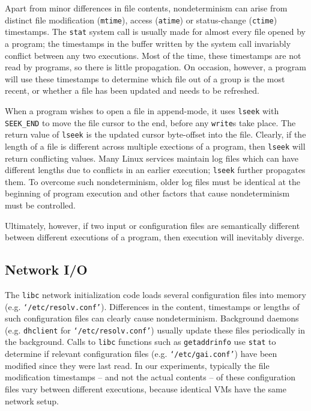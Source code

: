  \newline
Apart from minor differences in file contents,
nondeterminism can arise from distinct file 
modification (\texttt{mtime}), access (\texttt{atime}) or status-change (\texttt{ctime})
timestamps.
The \texttt{stat} system call is usually made for almost
every file opened by a program; the timestamps
in the buffer written by the system call invariably
conflict between any two executions. Most of the time,
these timestamps are not read by programs,
so there is little propagation. On occasion, 
however, a program will use these timestamps
to determine which file out of a group is the most recent, 
or whether a file has been updated
and needs to be refreshed. \newline

 \newline
When a program wishes to open
a file in append-mode, it uses \texttt{lseek}
with \texttt{SEEK\_END} to move
the file cursor to the end,
before any \texttt{write}s take place.
The return value of \texttt{lseek} is the
updated cursor byte-offset into the file.
Clearly, if the length of a file is different across
multiple exections of a program, then
\texttt{lseek} will return conflicting values.
Many Linux services maintain log files
which can have different lengths due
to conflicts in an earlier execution; \texttt{lseek}
further propagates them. To overcome
such nondeterminism, older log files
must be identical at the beginning 
of program execution and other
factors that cause nondeterminism
must be controlled. 

\newpage
Ultimately, however, if two input or configuration files
are semantically different between
different executions of a program, then 
execution will inevitably diverge. 

\subsection{Network I/O} \label{ch3:netio}
 \newline
The \texttt{libc} network initialization
code loads several configuration files
into memory (e.g. \texttt{`/etc/resolv.conf'}). 
Differences in the content, timestamps or lengths
of such configuration files can clearly cause nondeterminism.
Background daemons (e.g. \texttt{dhclient} for \texttt{`/etc/resolv.conf'}) 
usually update these files periodically in the background.
Calls to \texttt{libc} functions such as \texttt{getaddrinfo} use \texttt{stat} 
to determine if relevant configuration files (e.g. \texttt{`/etc/gai.conf'})
have been modified since they were last read. 
In our experiments, typically the file modification timestamps 
-- and not the actual contents -- of these configuration files vary between different executions,
because identical VMs have the same network setup. \newline

